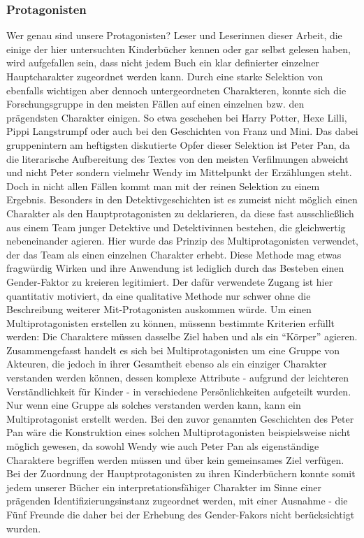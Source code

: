 \subsubsection{Protagonisten}

Wer genau sind unsere Protagonisten? Leser und Leserinnen dieser Arbeit,
die einige der hier untersuchten Kinderbücher kennen oder gar selbst
gelesen haben, wird aufgefallen sein, dass nicht jedem Buch ein klar
definierter einzelner Hauptcharakter zugeordnet werden kann. Durch eine
starke Selektion von ebenfalls wichtigen aber dennoch untergeordneten
Charakteren, konnte sich die Forschungsgruppe in den meisten Fällen auf
einen einzelnen bzw. den prägendsten Charakter einigen. So etwa
geschehen bei Harry Potter, Hexe Lilli, Pippi Langstrumpf oder auch bei
den Geschichten von Franz und Mini. Das dabei gruppenintern am
heftigsten diskutierte Opfer dieser Selektion ist Peter Pan, da die
literarische Aufbereitung des Textes von den meisten Verfilmungen
abweicht und nicht Peter sondern vielmehr Wendy im Mittelpunkt der
Erzählungen steht. Doch in nicht allen Fällen kommt man mit der reinen
Selektion zu einem Ergebnis. Besonders in den Detektivgeschichten ist es
zumeist nicht möglich einen Charakter als den Hauptprotagonisten zu
deklarieren, da diese fast ausschließlich aus einem Team junger
Detektive und Detektivinnen bestehen, die gleichwertig nebeneinander
agieren. Hier wurde das Prinzip des Multiprotagonisten verwendet, der
das Team als einen einzelnen Charakter erhebt. Diese Methode mag etwas
fragwürdig Wirken und ihre Anwendung ist lediglich durch das Besteben
einen Gender-Faktor zu kreieren legitimiert. Der dafür verwendete Zugang
ist hier quantitativ motiviert, da eine qualitative Methode nur schwer
ohne die Beschreibung weiterer Mit-Protagonisten auskommen würde. Um
einen Multiprotagonisten erstellen zu können, müssenn bestimmte
Kriterien erfüllt werden: Die Charaktere müssen dasselbe Ziel haben und
als ein ``Körper'' agieren. Zusammengefasst handelt es sich bei
Multiprotagonisten um eine Gruppe von Akteuren, die jedoch in ihrer
Gesamtheit ebenso als ein einziger Charakter verstanden werden können,
dessen komplexe Attribute - aufgrund der leichteren Verständlichkeit für
Kinder - in verschiedene Persönlichkeiten aufgeteilt wurden. Nur wenn
eine Gruppe als solches verstanden werden kann, kann ein
Multiprotagonist erstellt werden. Bei den zuvor genannten Geschichten
des Peter Pan wäre die Konstruktion eines solchen Multiprotagonisten
beispielsweise nicht möglich gewesen, da sowohl Wendy wie auch Peter Pan
als eigenständige Charaktere begriffen werden müssen und über kein
gemeinsames Ziel verfügen. Bei der Zuordnung der Hauptprotagonisten zu
ihren Kinderbüchern konnte somit jedem unserer Bücher ein
interpretationsfähiger Charakter im Sinne einer prägenden
Identifizierungsinstanz zugeordnet werden, mit einer Ausnahme - die Fünf
Freunde die daher bei der Erhebung des Gender-Fakors nicht
berücksichtigt wurden.

